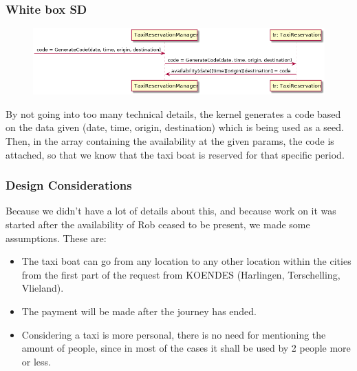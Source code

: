 \ifdim\ht\mysavebox>\textheight
    \setlength{\myrest}{\ht\mysavebox}%
    \loop\ifdim\myrest>\textheight
        \newpage\par\noindent
        \clipbox{0 {\myrest-\textheight} 0 {\ht\mysavebox-\myrest}}{\usebox{\mysavebox}}%
        \addtolength{\myrest}{-\textheight}%
    \repeat
    \newpage\par\noindent
    \clipbox{0 0 0 {\ht\mysavebox-\myrest}}{\usebox{\mysavebox}}%
\else
    \usebox{\mysavebox}%
\fi

\subsubsection{White box SD}
\creator{\studentC}
\begin{figure}[H]
\includegraphics[scale=0.5]{Iteration_3/Files/UC6_wb.png}
\end{figure}
By not going into too many technical details, the kernel generates a code based on the data given (date, time, origin, destination) which is being used as a seed. Then, in the array containing the availability at the given params, the code is attached, so that we know that the taxi boat is reserved for that specific period.

\subsubsection{Design Considerations}
Because we didn't have a lot of details about this, and because work on it was started after the availability of Rob ceased to be present, we made some assumptions. These are:
\begin{itemize}
    \item The taxi boat can go from any location to any other location within the cities from the first part of the request from KOENDES (Harlingen, Terschelling, Vlieland).
    \item The payment will be made after the journey has ended.
    \item Considering a taxi is more personal, there is no need for mentioning the amount of people, since in most of the cases it shall be used by 2 people more or less.
\end{itemize}